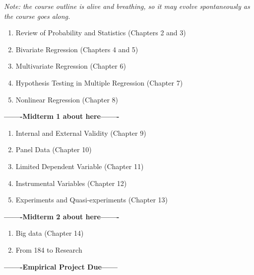 \documentclass[
]{article}
\providecommand{\tightlist}{%
  \setlength{\itemsep}{0pt}\setlength{\parskip}{0pt}}
\begin{document}
\emph{Note: the course outline is alive and breathing, so it may evolve
spontaneously as the course goes along.}

\begin{enumerate}
\def\labelenumi{\arabic{enumi}.}
\tightlist
\item
  Review of Probability and Statistics (Chapters 2 and 3)
\item
  Bivariate Regression (Chapters 4 and 5)
\item
  Multivariate Regression (Chapter 6)
\item
  Hypothesis Testing in Multiple Regression (Chapter 7)
\item
  Nonlinear Regression (Chapter 8)
\end{enumerate}

\textbf{-------Midterm 1 about here-------}

\begin{enumerate}
\def\labelenumi{\arabic{enumi}.}
\setcounter{enumi}{5}
\tightlist
\item
  Internal and External Validity (Chapter 9)
\item
  Panel Data (Chapter 10)
\item
  Limited Dependent Variable (Chapter 11)
\item
  Instrumental Variables (Chapter 12)
\item
  Experiments and Quasi-experiments (Chapter 13)
\end{enumerate}

\textbf{-------Midterm 2 about here-------}

\begin{enumerate}
\def\labelenumi{\arabic{enumi}.}
\setcounter{enumi}{10}
\tightlist
\item
  Big data (Chapter 14)
\item
  From 184 to Research
\end{enumerate}

\textbf{-------Empirical Project Due------}
\end{document}
